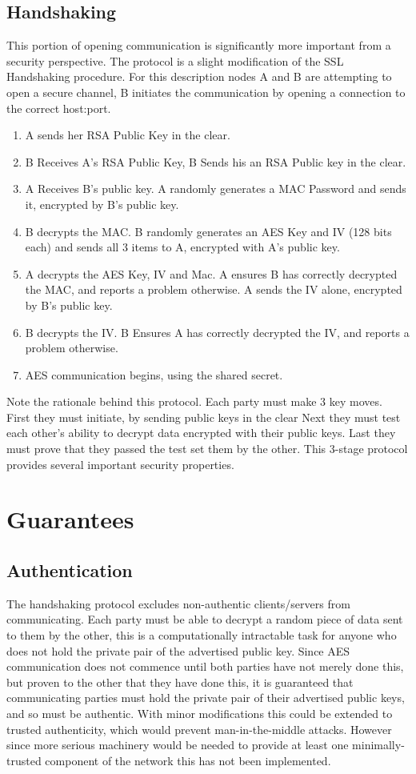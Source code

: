 \subsection{Handshaking}
This portion of opening communication is significantly more important from a security perspective.
The protocol is a slight modification of the SSL Handshaking procedure.
For this description nodes A and B are attempting to open a secure channel, B initiates the communication by opening a connection to the correct host:port.
\begin{enumerate}
	\item A sends her RSA Public Key in the clear.
	\item B Receives A's RSA Public Key, B Sends his an RSA Public key in the clear.
	\item A Receives B's public key. A randomly generates a MAC Password and sends it, encrypted by B's public key.
	\item B decrypts the MAC.  B randomly generates an AES Key and IV (128 bits each) and sends all 3 items to A, encrypted with A's public key.
	\item A decrypts the AES Key, IV and Mac.  A ensures B has correctly decrypted the MAC, and reports a problem otherwise.  A sends the IV alone, encrypted by B's public key.
	\item B decrypts the IV.  B Ensures A has correctly decrypted the IV, and reports a problem otherwise.
	\item AES communication begins, using the shared secret.
\end{enumerate}
Note the rationale behind this protocol.
Each party must make 3 key moves.
First they must initiate, by sending public keys in the clear
Next they must test each other's ability to decrypt data encrypted with their public keys.
Last they must prove that they passed the test set them by the other.
This 3-stage protocol provides several important security properties.

\section {Guarantees}
\subsection{Authentication}
The handshaking protocol excludes non-authentic clients/servers from communicating.
Each party must be able to decrypt a random piece of data sent to them by the other, this is a computationally intractable task for anyone who does not hold the private pair of the advertised public key.
Since AES communication does not commence until both parties have not merely done this, but proven to the other that they have done this, it is guaranteed that communicating parties must hold the private pair of their advertised public keys, and so must be authentic.
With minor modifications this could be extended to trusted authenticity, which would prevent man-in-the-middle attacks.
However since more serious machinery would be needed to provide at least one minimally-trusted component of the network this has not been implemented.

